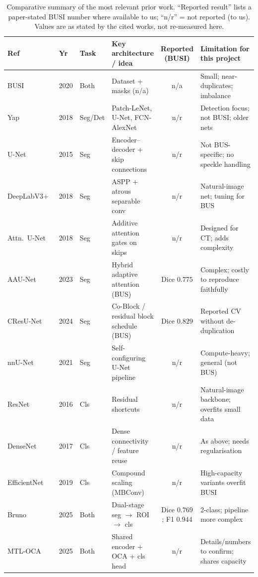 \documentclass[11pt]{article}
\begin{document}
\begin{table}[t]
\centering
\caption{Comparative summary of the most relevant prior work. ``Reported result''
lists a paper-stated BUSI number where available to us; ``n/r'' = not reported
(to us). Values are as stated by the cited works, not re-measured here.}
\label{tab:litcompare}
\footnotesize
\begin{tabularx}{\linewidth}{@{}l l l Y c Y@{}}
\toprule
Ref & Yr & Task & Key architecture / idea & Reported (BUSI) & Limitation for this project \\
\midrule
BUSI~\cite{aldhabyani2020busi}        & 2020 & Both & Dataset + masks (n/a)                     & n/a    & Small; near-duplicates; imbalance \\
Yap~\cite{yap2018cnn}                 & 2018 & Seg/Det & Patch-LeNet, U-Net, FCN-AlexNet        & n/r    & Detection focus; not BUSI; older nets \\
U-Net~\cite{ronneberger2015unet}      & 2015 & Seg  & Encoder--decoder + skip connections      & n/r    & Not BUS-specific; no speckle handling \\
DeepLabV3+~\cite{chen2018deeplabv3plus}& 2018 & Seg  & ASPP + atrous separable conv             & n/r    & Natural-image net; tuning for BUS \\
Attn.\ U-Net~\cite{oktay2018attentionunet}& 2018 & Seg & Additive attention gates on skips        & n/r    & Designed for CT; adds complexity \\
AAU-Net~\cite{chen2023aaunet}         & 2023 & Seg  & Hybrid adaptive attention (BUS)          & Dice $0.775$ & Complex; costly to reproduce faithfully \\
CResU-Net~\cite{derakhshandeh2024cresunet}& 2024 & Seg & Co-Block / residual block schedule (BUS) & Dice $0.829$ & Reported CV without de-duplication \\
nnU-Net~\cite{isensee2021nnunet}      & 2021 & Seg  & Self-configuring U-Net pipeline          & n/r    & Compute-heavy; general (not BUS) \\
ResNet~\cite{he2016resnet}            & 2016 & Cls  & Residual shortcuts                       & n/r    & Natural-image backbone; overfits small data \\
DenseNet~\cite{huang2017densenet}     & 2017 & Cls  & Dense connectivity / feature reuse       & n/r    & As above; needs regularisation \\
EfficientNet~\cite{tan2019efficientnet}& 2019 & Cls  & Compound scaling (MBConv)                & n/r    & High-capacity variants overfit BUSI \\
Bruno~\cite{bruno2025dualstage}       & 2025 & Both & Dual-stage seg $\rightarrow$ ROI $\rightarrow$ cls & Dice $0.769$; F1 $0.944$ & 2-class; pipeline more complex \\
MTL-OCA~\cite{lu2025multitask}        & 2025 & Both & Shared encoder + OCA + cls head          & n/r    & Details/numbers to confirm; shares capacity \\
\bottomrule
\end{tabularx}
\end{table}
\end{document}
